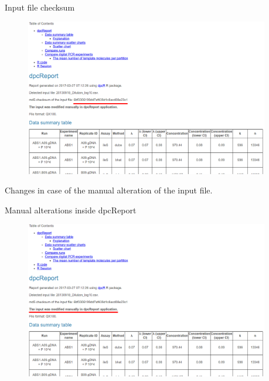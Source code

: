 \documentclass{beamer}\usepackage[]{graphicx}\usepackage[]{color}
\begin{document}
\begin{frame}{Input file checksum}
\begin{figure} 
\includegraphics[width=0.95\textwidth]{static_figure/dcpReport_reprod4.png}
\end{figure}

Changes in case of the manual alteration of the input file.

\end{frame}


\begin{frame}{Manual alterations inside dpcReport}
\begin{figure} 
\includegraphics[width=0.95\textwidth]{static_figure/dcpReport_reprod5.png}
\end{figure}
\end{frame}
\end{document}
